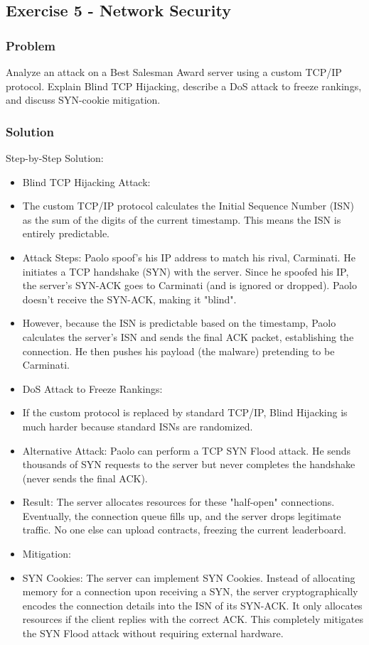 \documentclass{article}
\begin{document}
\subsection{Exercise 5 - Network Security}
\subsubsection*{Problem}
Analyze an attack on a Best Salesman Award server using a custom TCP/IP protocol. Explain Blind TCP Hijacking, describe a DoS attack to freeze rankings, and discuss SYN-cookie mitigation.

\subsubsection*{Solution}
Step-by-Step Solution:

\begin{itemize}
    \item[\textbf{1.}] Blind TCP Hijacking Attack:
    \item The custom TCP/IP protocol calculates the Initial Sequence Number (ISN) as the sum of the digits of the current timestamp. This means the ISN is entirely predictable.
    \item Attack Steps: Paolo spoof's his IP address to match his rival, Carminati. He initiates a TCP handshake (SYN) with the server. Since he spoofed his IP, the server's SYN-ACK goes to Carminati (and is ignored or dropped). Paolo doesn't receive the SYN-ACK, making it "blind".
    \item However, because the ISN is predictable based on the timestamp, Paolo calculates the server's ISN and sends the final ACK packet, establishing the connection. He then pushes his payload (the malware) pretending to be Carminati.

    \item[\textbf{2.}] DoS Attack to Freeze Rankings:
    \item If the custom protocol is replaced by standard TCP/IP, Blind Hijacking is much harder because standard ISNs are randomized.
    \item Alternative Attack: Paolo can perform a TCP SYN Flood attack. He sends thousands of SYN requests to the server but never completes the handshake (never sends the final ACK).
    \item Result: The server allocates resources for these "half-open" connections. Eventually, the connection queue fills up, and the server drops legitimate traffic. No one else can upload contracts, freezing the current leaderboard.

    \item[\textbf{3.}] Mitigation:
    \item SYN Cookies: The server can implement SYN Cookies. Instead of allocating memory for a connection upon receiving a SYN, the server cryptographically encodes the connection details into the ISN of its SYN-ACK. It only allocates resources if the client replies with the correct ACK. This completely mitigates the SYN Flood attack without requiring external hardware.
\end{itemize}
\end{document}
